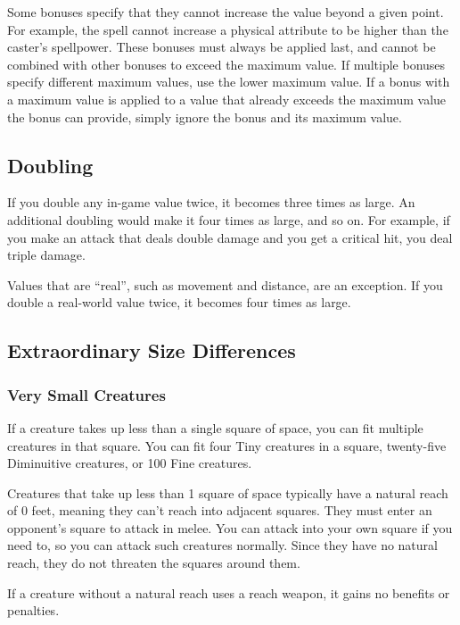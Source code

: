         Some bonuses specify that they cannot increase the value beyond a given point.
        For example, the  spell cannot increase a physical attribute to be higher than the caster's spellpower.
        These bonuses must always be applied last, and cannot be combined with other bonuses to exceed the maximum value.
        If multiple bonuses specify different maximum values, use the lower maximum value.
        If a bonus with a maximum value is applied to a value that already exceeds the maximum value the bonus can provide, simply ignore the bonus and its maximum value.

    \subsection{Doubling}\label{Doubling}
        If you double any in-game value twice, it becomes three times as large. An additional doubling would make it four times as large, and so on. For example, if you make an attack that deals double damage and you get a critical hit, you deal triple damage.

         Values that are ``real'', such as movement and distance, are an exception. If you double a real-world value twice, it becomes four times as large.

    \subsection{Extraordinary Size Differences}\label{Special Size Rules}

        \subsubsection{Very Small Creatures}
             If a creature takes up less than a single square of space, you can fit multiple creatures in that square. You can fit four Tiny creatures in a square, twenty-five Diminuitive creatures, or 100 Fine creatures.

             Creatures that take up less than 1 square of space typically have a natural reach of 0 feet, meaning they can't reach into adjacent squares. They must enter an opponent's square to attack in melee. You can attack into your own square if you need to, so you can attack such creatures normally. Since they have no natural reach, they do not threaten the squares around them.

            If a creature without a natural reach uses a reach weapon, it gains no benefits or penalties.

